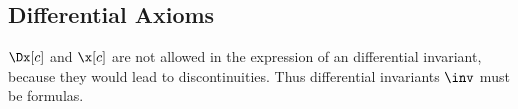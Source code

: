     \subsection{Differential Axioms}
        \label{sec:differential-axioms}

        \begin{calculus}
            \cinferenceRule[]{}{
                \D{} =
            }{}
            \cinferenceRule[]{}{
                \D{} =
            }{}
            \cinferenceRule[]{}{
                \D{} =
            }{}
        \end{calculus}
    
        \begin{calculus}
        \end{calculus}

        $\Dx[c]$ and $\x[c]$ are not allowed in the expression of an differential invariant, because they would lead to discontinuities. Thus differential invariants $\inv$ must be \FOLR formulas.


